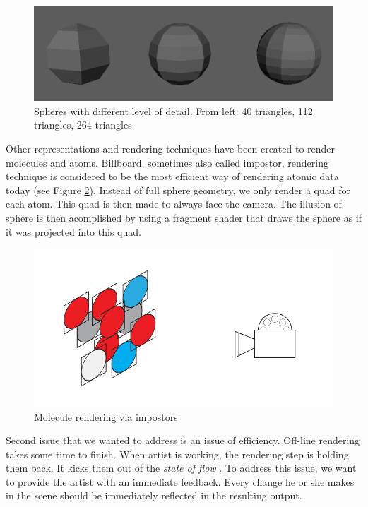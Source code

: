 \documentclass[
  digital, %
  table,   %
  nolof,     %
  nolot,     %
  oneside,
]{fithesis3}
\begin{document}
\begin{figure}
  \centering
  \includegraphics[scale=0.3]{images/spheres.png}
  \caption{Spheres with different level of detail. From left: 40 triangles, 112 triangles, 264 triangles}
  \label{fig:spheres-lod}
\end{figure}

Other representations and rendering techniques have been created to render molecules and atoms. Billboard, sometimes also called impostor, rendering technique is considered to be the most efficient way of rendering atomic data today (see Figure \ref{fig:impostor-rendering}). Instead of full sphere geometry, we only render a quad for each atom. This quad is then made to always face the camera. The illusion of sphere is then acomplished by using a fragment shader that draws the sphere as if it was projected into this quad.

\begin{figure}
  \centering
  \includegraphics[scale=0.8]{images/billboards.pdf}
  \caption{Molecule rendering via impostors}
  \label{fig:impostor-rendering}
\end{figure}

Second issue that we wanted to address is an issue of efficiency. Off-line rendering takes some time to finish. When artist is working, the rendering step is holding them back. It kicks them out of the \textit{state of flow} \cite{FlowTheoryandResearch}. To address this issue, we want to provide the artist with an immediate feedback. Every change he or she makes in the scene should be immediately reflected in the resulting output.
\end{document}
